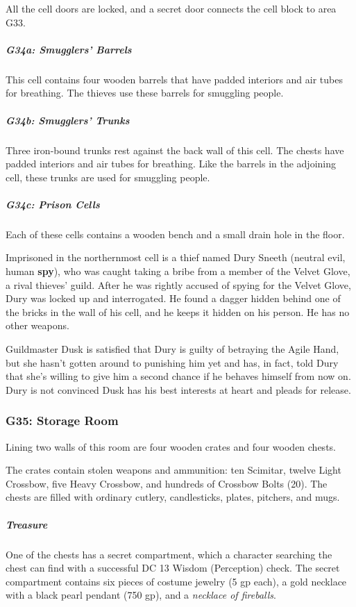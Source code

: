 \documentclass[10pt,a4paper,twoside,bg=print,twocolumn,openany,nodeprecatedcode]{dndbook}
\begin{document}
All the cell doors are locked, and a secret door connects the cell block to area G33.

\subparagraph{G34a: Smugglers' Barrels}
This cell contains four wooden barrels that have padded interiors and air tubes for breathing. The thieves use these barrels for smuggling people.

\subparagraph{G34b: Smugglers' Trunks}
Three iron-bound trunks rest against the back wall of this cell. The chests have padded interiors and air tubes for breathing. Like the barrels in the adjoining cell, these trunks are used for smuggling people.

\subparagraph{G34c: Prison Cells}
Each of these cells contains a wooden bench and a small drain hole in the floor.

Imprisoned in the northernmost cell is a thief named Dury Sneeth (neutral evil, human \textbf{spy}), who was caught taking a bribe from a member of the Velvet Glove, a rival thieves' guild. After he was rightly accused of spying for the Velvet Glove, Dury was locked up and interrogated. He found a dagger hidden behind one of the bricks in the wall of his cell, and he keeps it hidden on his person. He has no other weapons.

Guildmaster Dusk is satisfied that Dury is guilty of betraying the Agile Hand, but she hasn't gotten around to punishing him yet and has, in fact, told Dury that she's willing to give him a second chance if he behaves himself from now on. Dury is not convinced Dusk has his best interests at heart and pleads for release.

\subsubsection{G35: Storage Room}
\begin{DndReadAloud}{}
Lining two walls of this room are four wooden crates and four wooden chests.

\end{DndReadAloud}

The crates contain stolen weapons and ammunition: ten Scimitar, twelve Light Crossbow, five Heavy Crossbow, and hundreds of Crossbow Bolts (20). The chests are filled with ordinary cutlery, candlesticks, plates, pitchers, and mugs.

\subparagraph{Treasure}
One of the chests has a secret compartment, which a character searching the chest can find with a successful DC 13 Wisdom (Perception) check. The secret compartment contains six pieces of costume jewelry (5 gp each), a gold necklace with a black pearl pendant (750 gp), and a \textit{necklace of fireballs}.
\end{document}

